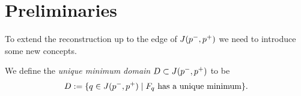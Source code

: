\section{Preliminaries}
To extend the reconstruction up to the edge of $J(p^-,p^+)$ we need to introduce some new concepts.

\begin{definition}\label{def:uniquemindomain}
   We define the \emph{unique minimum domain} $D\subset J(p^-,p^+)$ to be 
   \begin{equation}
        D:=\{q\in J(p^-,p^+) \mid F_q\text{ has a unique minimum}\}.
   \end{equation} 
\end{definition}



